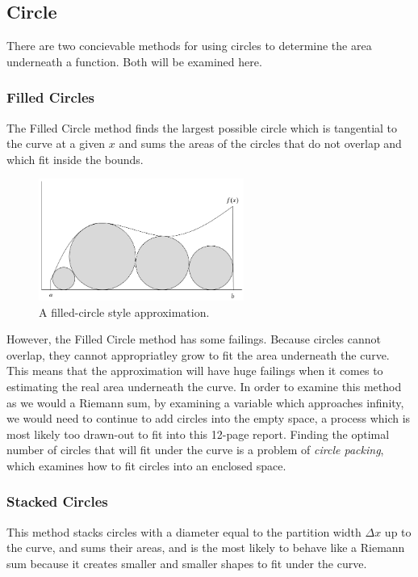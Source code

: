 \documentclass[12pt]{article}
\begin{document}
    \subsection{Circle}
      There are two concievable methods for using circles to determine the area underneath a function. Both will be examined here.

      \subsubsection{Filled Circles}
        The Filled Circle method finds the largest possible circle which is tangential to the curve at a given \( x \) and sums the areas of the circles that do not overlap and which fit inside the bounds.

        \begin{figure}[h]
          \centering
          \includegraphics[width=0.6\textwidth]{circle_example_2}
          \caption{A filled-circle style approximation.}
        \end{figure}

        However, the Filled Circle method has some failings. Because circles cannot overlap, they cannot appropriatley grow to fit the area underneath the curve. This means that the approximation will have huge failings when it comes to estimating the real area underneath the curve. In order to examine this method as we would a Riemann sum, by examining a variable which approaches infinity, we would need to continue to add circles into the empty space, a process which is most likely too drawn-out to fit into this 12-page report. Finding the optimal number of circles that will fit under the curve is a problem of \emph{circle packing}, which examines how to fit circles into an enclosed space. \cite{aldar03}

      \subsubsection{Stacked Circles}
        This method stacks circles with a diameter equal to the partition width \( \Delta x \) up to the curve, and sums their areas, and is the most likely to behave like a Riemann sum because it creates smaller and smaller shapes to fit under the curve.
\end{document}

